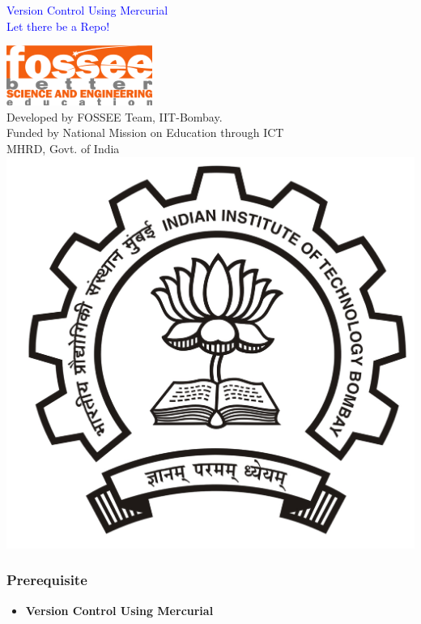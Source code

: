 \documentclass[14pt,compress]{beamer}
\author[Primal Pappachan] {}
\institute[FOSSEE group] {}
\date[IIT Bombay] {}
\begin{document}
\begin{frame}

\begin{center}
\vspace{15pt}
\textcolor{blue}{\large Version Control Using Mercurial} \\
\textcolor{blue}{\huge Let there be a Repo!}
\end{center}
\vspace{15pt}
\begin{center}
\includegraphics[scale=0.95]{../images/fossee-logo.png}\\
\vspace{5pt}
\scriptsize Developed by FOSSEE Team, IIT-Bombay. \\ 
\scriptsize Funded by National Mission on Education through ICT\\
\scriptsize  MHRD, Govt. of India\\
\includegraphics[scale=0.15]{../images/iitb-logo.jpg}\\
\end{center}
\end{frame}

\begin{frame}
	\frametitle{Prerequisite}
	\begin{itemize}
	\item \textbf{Version Control Using Mercurial}
	\end{itemize}
\end{frame}
\end{document}
